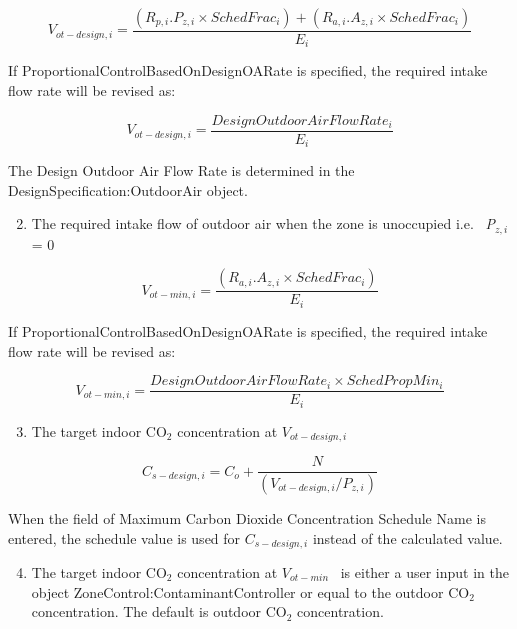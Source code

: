 \begin{equation}
{V_{ot - design,i}} = \frac{{\left( {{R_{p,i}}.{P_{z,i}} \times {SchedFrac_i}} \right) + ({R_{a,i}}.{A_{z,i}} \times {SchedFrac_i})}}{{{E_i}}}
\end{equation}

If ProportionalControlBasedOnDesignOARate is specified, the required intake flow rate will be revised as:

\begin{equation}
{V_{ot - design,i}} = \frac{Design Outdoor Air Flow Rate_i} {E_i}
\end{equation}

The Design Outdoor Air Flow Rate is determined in the DesignSpecification:OutdoorAir object.

\begin{enumerate}
\setcounter{enumi}{1}
\item The required intake flow of outdoor air when the zone is unoccupied i.e.~ \emph{P\(_{z,i}\)} = 0
\end{enumerate}

\begin{equation}
{V_{ot - min,i}} = \frac{{({R_{a,i}}.{A_{z,i}} \times {SchedFrac_i})}}{{{E_i}}}
\end{equation}

If ProportionalControlBasedOnDesignOARate is specified, the required intake flow rate will be revised as:

\begin{equation}
{V_{ot - min,i}} = \frac{ {Design Outdoor Air Flow Rate_i} \times {SchedPropMin_i} } {E_i}
\end{equation}

\begin{enumerate}
\setcounter{enumi}{2}
\item The target indoor CO\(_{2}\) concentration at \({V_{ot - design,i}}\)
\end{enumerate}

\begin{equation}
{C_{s - design,i}} = {C_o} + \frac{N}{{\left( {{V_{ot - design,i}}/{P_{z,i}}} \right)}}
\end{equation}

When the field of Maximum Carbon Dioxide Concentration Schedule Name is entered, the schedule value is used for {$C_{s - design,i}$} instead of the calculated value.

\begin{enumerate}
\setcounter{enumi}{3}
\item The target indoor CO\(_{2}\) concentration at \({V_{ot - min}}\) ~is either a user input in the object ZoneControl:ContaminantController or equal to the outdoor CO\(_{2}\) concentration. The default is outdoor CO\(_{2}\) concentration.
\end{enumerate}

